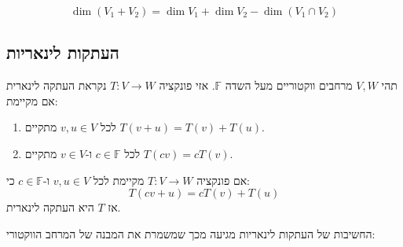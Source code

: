 \documentclass{tstextbook}
\begin{document}
\begin{proposition}
$$\dim(V_{1}+V_{2})=\dim V_{1}+\dim V_{2}-\dim(V_{1}\cap V_{2})$$

\end{proposition}
\subsection{העתקות לינאריות}

\begin{definition}
תהי \(V,W\) מרחבים ווקטוריים מעל השדה \(\mathbb{F}\). אזי פונקציה \(T:V\to W\) נקראת העתקה לינארית אם מקיימת:

  \begin{enumerate}
    \item לכל \(v, u \in V\) מתקיים \(T(v+u)=T(v)+T(u)\). 


    \item לכל \(c \in \mathbb{F}\) ו-\(v \in V\) מתקיים \(T(cv)=cT(v)\). 


  \end{enumerate}
\end{definition}
\begin{proposition}
אם פונקציה \(T:V\to W\) מקיימת לכל \(v,u \in V\) ו-\(c \in \mathbb{F}\) כי:
$$T(cv+u)=cT(v)+T(u)$$
אז \(T\) היא העתקה לינארית.

\end{proposition}
החשיבות של העתקות לינאריות מגיעה מכך שמשמרת את המבנה של המרחב הווקטורי:
\end{document}
